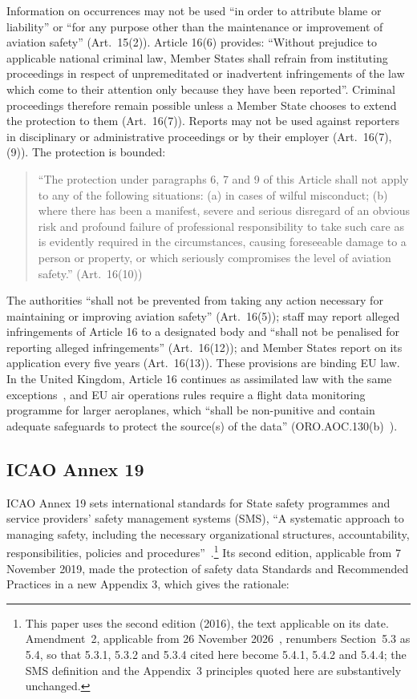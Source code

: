 \documentclass[review,12pt]{elsarticle}
\begin{document}
Information on occurrences may not be used ``in order to attribute blame or liability'' or ``for any purpose other than the maintenance or improvement of aviation safety'' (Art.~15(2)). Article 16(6) provides: ``Without prejudice to applicable national criminal law, Member States shall refrain from instituting proceedings in respect of unpremeditated or inadvertent infringements of the law which come to their attention only because they have been reported''. Criminal proceedings therefore remain possible unless a Member State chooses to extend the protection to them (Art.~16(7)). Reports may not be used against reporters in disciplinary or administrative proceedings or by their employer (Art.~16(7), (9)). The protection is bounded:

\begin{quote}
``The protection under paragraphs 6, 7 and 9 of this Article shall not apply to any of the following situations: (a) in cases of wilful misconduct; (b) where there has been a manifest, severe and serious disregard of an obvious risk and profound failure of professional responsibility to take such care as is evidently required in the circumstances, causing foreseeable damage to a person or property, or which seriously compromises the level of aviation safety.'' (Art.~16(10))
\end{quote}

The authorities ``shall not be prevented from taking any action necessary for maintaining or improving aviation safety'' (Art.~16(5)); staff may report alleged infringements of Article 16 to a designated body and ``shall not be penalised for reporting alleged infringements'' (Art.~16(12)); and Member States report on its application every five years (Art.~16(13)). These provisions are binding EU law. In the United Kingdom, Article 16 continues as assimilated law with the same exceptions~\cite{uk376}, and EU air operations rules require a flight data monitoring programme for larger aeroplanes, which ``shall be non-punitive and contain adequate safeguards to protect the source(s) of the data'' (ORO.AOC.130(b)~\cite{eu965}).

\subsection{ICAO Annex 19}\label{sec:icao}

ICAO Annex 19 sets international standards for State safety programmes and service providers' safety management systems (SMS), ``A systematic approach to managing safety, including the necessary organizational structures, accountability, responsibilities, policies and procedures''~\cite[Chapter~1]{icao2016}.\footnote{This paper uses the second edition (2016), the text applicable on its date. Amendment~2, applicable from 26 November 2026~\cite{icao2025}, renumbers Section~5.3 as 5.4, so that 5.3.1, 5.3.2 and 5.3.4 cited here become 5.4.1, 5.4.2 and 5.4.4; the SMS definition and the Appendix~3 principles quoted here are substantively unchanged.} Its second edition, applicable from 7 November 2019, made the protection of safety data Standards and Recommended Practices in a new Appendix 3, which gives the rationale:
\end{document}
